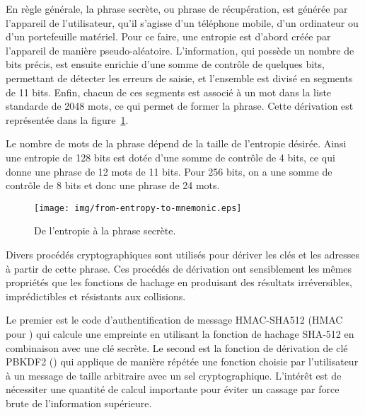 
En règle générale, la phrase secrète, ou phrase de récupération, est générée par l'appareil de l'utilisateur, qu'il s'agisse d'un téléphone mobile, d'un ordinateur ou d'un portefeuille matériel. Pour ce faire, une entropie est d'abord créée par l'appareil de manière pseudo-aléatoire. L'information, qui possède un nombre de bits précis, est ensuite enrichie d'une somme de contrôle de quelques bits, permettant de détecter les erreurs de saisie, et l'ensemble est divisé en segments de 11 bits. Enfin, chacun de ces segments est associé à un mot dans la liste standarde de 2048 mots, ce qui permet de former la phrase. Cette dérivation est représentée dans la figure~\ref{fig:from-entropy-to-mnemonic}.

Le nombre de mots de la phrase dépend de la taille de l'entropie désirée. Ainsi une entropie de 128 bits est dotée d'une somme de contrôle de 4 bits, ce qui donne une phrase de 12 mots de 11 bits. Pour 256 bits, on a une somme de contrôle de 8 bits et donc une phrase de 24 mots.

\begin{figure}[h]
  \advance\leftskip-1.5cm
  \texttt{[image: img/from-entropy-to-mnemonic.eps]}
  \caption{De l'entropie à la phrase secrète.}
  \label{fig:from-entropy-to-mnemonic}
\end{figure}


Divers procédés cryptographiques sont utilisés pour dériver les clés et les adresses à partir de cette phrase. Ces procédés de dérivation ont sensiblement les mêmes propriétés que les fonctions de hachage en produisant des résultats irréversibles, imprédictibles et résistants aux collisions.

Le premier est le code d'authentification de message HMAC-SHA512 (HMAC pour ) qui calcule une empreinte en utilisant la fonction de hachage SHA-512 en combinaison avec une clé secrète. Le second est la fonction de dérivation de clé PBKDF2 () qui applique de manière répétée une fonction choisie par l'utilisateur à un message de taille arbitraire avec un sel cryptographique.  L'intérêt est de nécessiter une quantité de calcul importante pour éviter un cassage par force brute de l'information supérieure.

